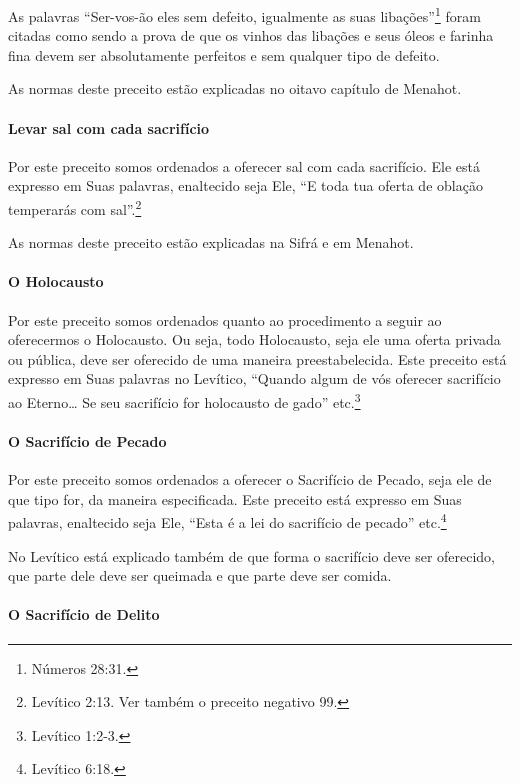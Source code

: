 As palavras ``Ser-vos-ão eles sem defeito, igualmente as suas libações''\footnote{Números 28:31.} foram citadas como sendo a prova de que os vinhos das
libações e seus óleos e farinha fina devem ser absolutamente perfeitos
e sem qualquer tipo de defeito.

As normas deste preceito estão explicadas no oitavo capítulo de Menahot.

\paragraph{Levar sal com cada sacrifício}

Por este preceito somos ordenados a oferecer sal com cada sacrifício.
Ele está expresso em Suas palavras, enaltecido seja Ele, ``E toda tua
oferta de oblação temperarás com sal''.\footnote{Levítico
2:13. Ver também o preceito negativo 99.}

As normas deste preceito estão explicadas na Sifrá e em Menahot.

\paragraph{O Holocausto}

Por este preceito somos ordenados quanto ao procedimento a seguir ao
oferecermos o Holocausto. Ou seja, todo Holocausto, seja ele uma oferta
privada ou pública, deve ser oferecido de uma maneira preestabelecida.
Este preceito está expresso em Suas palavras no Levítico, ``Quando algum
de vós oferecer sacrifício ao Eterno\ldots{} Se seu sacrifício for holocausto
de gado'' etc.\footnote{Levítico 1:2-3.}

\paragraph{O Sacrifício de Pecado}

Por este preceito somos ordenados a oferecer o Sacrifício de Pecado,
seja ele de que tipo for, da maneira especificada. Este preceito está
expresso em Suas palavras, enaltecido seja Ele, ``Esta é a lei do
sacrifício de pecado'' etc.\footnote{Levítico 6:18.}

No Levítico está explicado também de que forma o sacrifício deve ser
oferecido, que parte dele deve ser queimada e que parte deve ser comida.

\paragraph{O Sacrifício de Delito}

